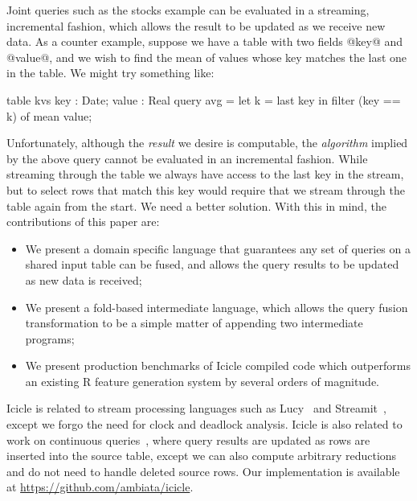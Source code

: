 Joint queries such as the stocks example can be evaluated in a streaming, incremental fashion, which allows the result to be updated as we receive new data. As a counter example, suppose we have a table with two fields @key@ and @value@, and we wish to find the mean of values whose key matches the last one in the table. We might try something like:
\begin{code}
  table kvs { key : Date; value : Real }
  query avg = let k = last key
              in  filter (key == k) of mean value;
\end{code}
Unfortunately, although the \emph{result} we desire is computable, the \emph{algorithm} implied by the above query cannot be evaluated in an incremental fashion. While streaming through the table we always have access to the last key in the stream, but to select rows that match this key would require that we stream through the table again from the start. We need a better solution. With this in mind, the contributions of this paper are:
\begin{itemize}
\item
We present a domain specific language that guarantees any set of queries on a shared input table can be fused, and allows the query results to be updated as new data is received;

\item
We present a fold-based intermediate language, which allows the query fusion transformation to be a simple matter of appending two intermediate programs;

\item
We present production benchmarks of Icicle compiled code which outperforms an existing R feature generation system by several orders of magnitude. 
\end{itemize}


Icicle is related to stream processing languages such as Lucy~\cite{mandel2010lucy} and Streamit~\cite{thies2002streamit}, except we forgo the need for clock and deadlock analysis. Icicle is also related to work on continuous queries~\cite{arasu2003cql}, where query results are updated as rows are inserted into the source table, except we can also compute arbitrary reductions and do not need to handle deleted source rows. Our implementation is available at \url{https://github.com/ambiata/icicle}.
